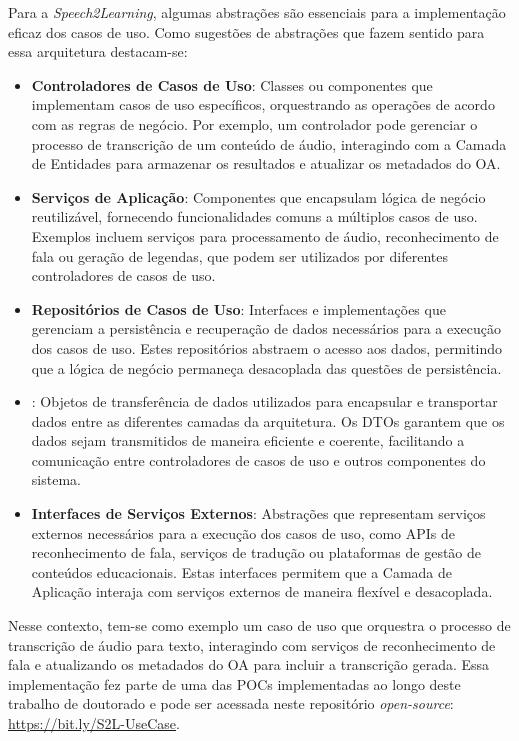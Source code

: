 Para a \textit{Speech2Learning}, algumas abstrações são essenciais para a implementação eficaz dos casos de uso. Como sugestões de abstrações que fazem sentido para essa arquitetura destacam-se:

\begin{itemize}
    \item \textbf{Controladores de Casos de Uso}: Classes ou componentes que implementam casos de uso específicos, orquestrando as operações de acordo com as regras de negócio. Por exemplo, um controlador pode gerenciar o processo de transcrição de um conteúdo de áudio, interagindo com a Camada de Entidades para armazenar os resultados e atualizar os metadados do OA.

    \item \textbf{Serviços de Aplicação}: Componentes que encapsulam lógica de negócio reutilizável, fornecendo funcionalidades comuns a múltiplos casos de uso. Exemplos incluem serviços para processamento de áudio, reconhecimento de fala ou geração de legendas, que podem ser utilizados por diferentes controladores de casos de uso.

    \item \textbf{Repositórios de Casos de Uso}: Interfaces e implementações que gerenciam a persistência e recuperação de dados necessários para a execução dos casos de uso. Estes repositórios abstraem o acesso aos dados, permitindo que a lógica de negócio permaneça desacoplada das questões de persistência.

    \item \textbf{}: Objetos de transferência de dados utilizados para encapsular e transportar dados entre as diferentes camadas da arquitetura. Os DTOs garantem que os dados sejam transmitidos de maneira eficiente e coerente, facilitando a comunicação entre controladores de casos de uso e outros componentes do sistema.

    \item \textbf{Interfaces de Serviços Externos}: Abstrações que representam serviços externos necessários para a execução dos casos de uso, como APIs de reconhecimento de fala, serviços de tradução ou plataformas de gestão de conteúdos educacionais. Estas interfaces permitem que a Camada de Aplicação interaja com serviços externos de maneira flexível e desacoplada.
\end{itemize}

Nesse contexto, tem-se como exemplo um caso de uso que orquestra o processo de transcrição de áudio para texto, interagindo com serviços de reconhecimento de fala e atualizando os metadados do OA para incluir a transcrição gerada. Essa implementação fez parte de uma das POCs implementadas ao longo deste trabalho de doutorado e pode ser acessada neste repositório \textit{open-source}: \url{https://bit.ly/S2L-UseCase}.

